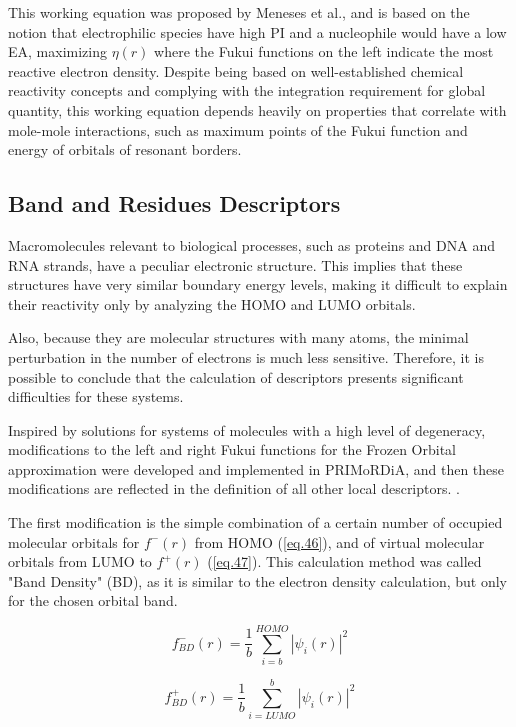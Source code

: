 \documentclass[a4paper,11pt]{refart}
\begin{document}
	This working equation was proposed by Meneses et al.\cite{meneses2004proposal}, and is based on the notion that electrophilic species have high PI and a nucleophile would have a low EA, maximizing $\eta(r)$ where the Fukui functions on the left indicate the most reactive electron density. Despite being based on well-established chemical reactivity concepts and complying with the integration requirement for global quantity, this working equation depends heavily on properties that correlate with mole-mole interactions, such as maximum points of the Fukui function and energy of orbitals of resonant borders.

	\subsection{Band and Residues Descriptors}

	Macromolecules relevant to biological processes, such as proteins and DNA and RNA strands, have a peculiar electronic structure. This implies that these structures have very similar boundary energy levels, making it difficult to explain their reactivity only by analyzing the HOMO and LUMO\cite{Fukushima2008} orbitals.

	Also, because they are molecular structures with many atoms, the minimal perturbation in the number of electrons is much less sensitive\cite{khandogin2003insights}. Therefore, it is possible to conclude that the calculation of descriptors presents significant difficulties for these systems.

	Inspired by solutions for systems of molecules with a high level of degeneracy, modifications to the left and right Fukui functions for the Frozen Orbital approximation were developed and implemented in PRIMoRDiA, and then these modifications are reflected in the definition of all other local descriptors. .

	The first modification is the simple combination of a certain number of occupied molecular orbitals for $f^-(r)$ from HOMO (\autoref{eq.46}), and of virtual molecular orbitals from LUMO to $f ^+(r)$ (\autoref{eq.47}). This calculation method was called "Band Density" (BD), as it is similar to the electron density calculation, but only for the chosen orbital band.

	\begin{equation}
	f^-_{BD}(r) = \frac{1}{b} \sum^{HOMO}_{i=b} |\psi_i(r)|^2
	\label{eq.46}
	\end{equation}

	\begin{equation}
	f^+_{BD}(r) = \frac{1}{b} \sum^{b}_{i=LUMO} |\psi_i(r)|^2
	\label{eq.47}
	\end{equation}
\end{document}
